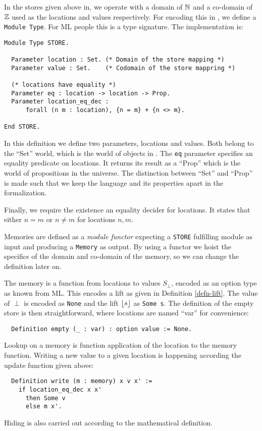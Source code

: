 In the stores given above in, we operate with a domain of $\mathbb{N}$ and a
co-domain of $\mathbb{Z}$ used as the locations and values respectively. For
encoding this in \coq{}, we define a \texttt{Module Type}. For ML
people this is a type signature. The implementation is:
\begin{verbatim}
Module Type STORE.

  Parameter location : Set. (* Domain of the store mapping *)
  Parameter value : Set.    (* Codomain of the store mappring *)

  (* locations have equality *)
  Parameter eq : location -> location -> Prop.
  Parameter location_eq_dec :
      forall (n m : location), {n = m} + {n <> m}.

End STORE.
\end{verbatim}
In this definition we define two parameters, locations and
values. Both belong to the ``Set'' world, which is the world of
objects in \coq{}. The \texttt{eq} parameter specifies an equality
predicate on locations. It returns its result as a ``Prop'' which is
the world of propositions in the universe. The distinction between
``Set'' and ``Prop'' is made such that we keep the language and its
properties apart in the formalization.

Finally, we require the existence an equality decider for
locations. It states that either $n = m$ or $n \neq m$ for locations
$n, m$.

Memories are defined as a \emph{module functor} expecting a
\texttt{STORE} fulfilling module as input and producing a
\texttt{Memory} as output. By using a functor we hoist the specifics
of the domain and co-domain of the memory, so we can change the
definition later on.

The memory is a function from locations to values $S_{\perp}$, encoded
as an option type as known from ML. This encodes a lift as given in
Definition \ref{defn-lift}. The value of $\perp$ is encoded as
\texttt{None} and the lift $\lfloor s \rfloor$ as \texttt{Some s}. The
definition of the empty store is then straightforward, where locations
are named ``var'' for convenience:
\begin{verbatim}
  Definition empty (_ : var) : option value := None.
\end{verbatim}
Lookup on a memory is function application of the location to the
memory function. Writing a new value to a given location is happening
according the update function given above:
\begin{verbatim}
  Definition write (m : memory) x v x' :=
    if location_eq_dec x x'
      then Some v
      else m x'.
\end{verbatim}
Hiding is also carried out according to the mathematical definition.

